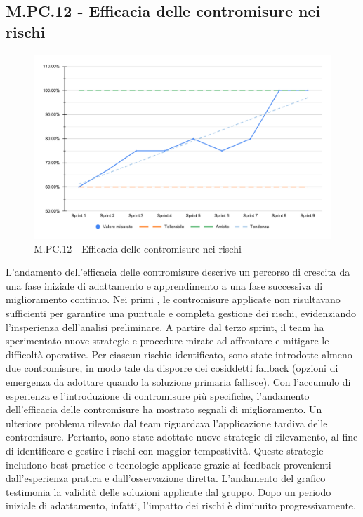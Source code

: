 \subsection{M.PC.12 - Efficacia delle contromisure nei rischi}
\begin{figure}[H]
    \centering
    \includegraphics[width=\textwidth]{assets/efficacia_contromisure.pdf}
    \caption{M.PC.12 - Efficacia delle contromisure nei rischi}
\end{figure}

\par L'andamento dell'efficacia delle contromisure descrive un percorso di crescita da una fase iniziale di adattamento e apprendimento a una fase successiva di miglioramento continuo. Nei primi , le contromisure applicate non risultavano sufficienti per garantire una puntuale e completa gestione dei rischi, evidenziando l’insperienza dell'analisi preliminare. A partire dal terzo sprint, il team ha sperimentato nuove strategie e procedure mirate ad affrontare e mitigare le difficoltà operative. Per ciascun rischio identificato, sono state introdotte almeno due contromisure, in modo tale da disporre dei cosiddetti fallback (opzioni di emergenza da adottare quando la soluzione primaria fallisce). Con l'accumulo di esperienza e l’introduzione di contromisure più specifiche, l'andamento dell'efficacia delle contromisure ha mostrato segnali di miglioramento. Un ulteriore problema rilevato dal team riguardava l’applicazione tardiva delle contromisure. Pertanto, sono state adottate nuove strategie di rilevamento, al fine di identificare e gestire i rischi con maggior tempestività. Queste strategie includono best practice e tecnologie applicate grazie ai feedback provenienti dall'esperienza pratica e dall’osservazione diretta. L’andamento del grafico testimonia la validità delle soluzioni applicate dal gruppo. Dopo un periodo iniziale di adattamento, infatti, l'impatto dei rischi è diminuito progressivamente. 
